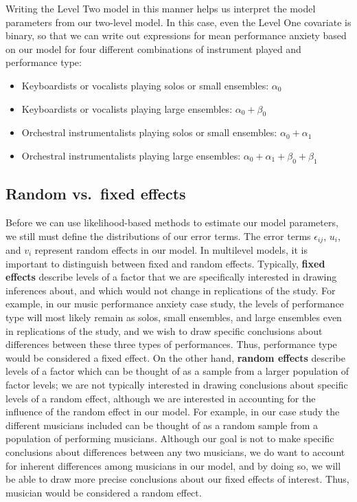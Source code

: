 \documentclass[
]{krantz}
\providecommand{\tightlist}{%
  \setlength{\itemsep}{0pt}\setlength{\parskip}{0pt}}
\begin{document}
Writing the Level Two model in this manner helps us interpret the model parameters from our two-level model. In this case, even the Level One covariate is binary, so that we can write out expressions for mean performance anxiety based on our model for four different combinations of instrument played and performance type:

\begin{itemize}
\tightlist
\item
  Keyboardists or vocalists playing solos or small ensembles: \(\alpha_{0}\)
\item
  Keyboardists or vocalists playing large ensembles: \(\alpha_{0}+\beta_{0}\)
\item
  Orchestral instrumentalists playing solos or small ensembles: \(\alpha_{0}+\alpha_{1}\)
\item
  Orchestral instrumentalists playing large ensembles: \(\alpha_{0}+\alpha_{1}+\beta_{0}+\beta_{1}\)
\end{itemize}

\hypertarget{random-vs.-fixed-effects}{%
\subsection{Random vs.~fixed effects}\label{random-vs.-fixed-effects}}

Before we can use likelihood-based methods to estimate our model parameters, we still must define the distributions of our error terms. The error terms \(\epsilon_{ij}\), \(u_{i}\), and \(v_{i}\) represent random effects in our model. In multilevel models, it is important to distinguish between fixed and random effects. Typically, \textbf{fixed effects}  describe levels of a factor that we are specifically interested in drawing inferences about, and which would not change in replications of the study. For example, in our music performance anxiety case study, the levels of performance type will most likely remain as solos, small ensembles, and large ensembles even in replications of the study, and we wish to draw specific conclusions about differences between these three types of performances. Thus, performance type would be considered a fixed effect. On the other hand, \textbf{random effects}  describe levels of a factor which can be thought of as a sample from a larger population of factor levels; we are not typically interested in drawing conclusions about specific levels of a random effect, although we are interested in accounting for the influence of the random effect in our model. For example, in our case study the different musicians included can be thought of as a random sample from a population of performing musicians. Although our goal is not to make specific conclusions about differences between any two musicians, we do want to account for inherent differences among musicians in our model, and by doing so, we will be able to draw more precise conclusions about our fixed effects of interest. Thus, musician would be considered a random effect.
\end{document}

